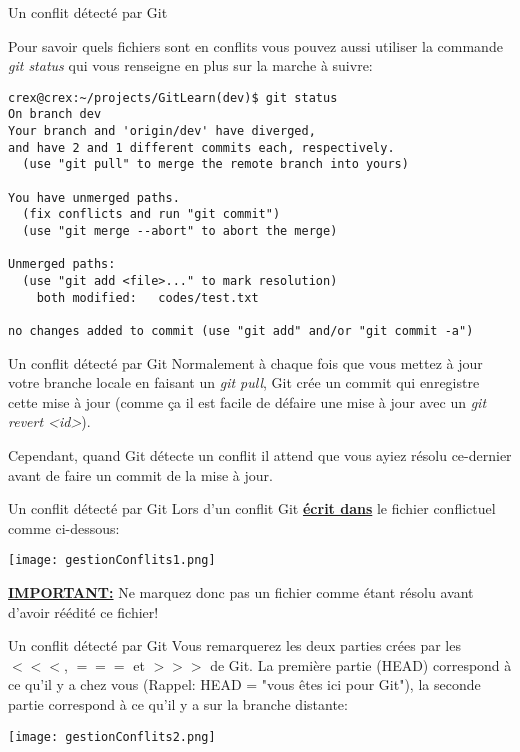 \documentclass{beamer}
\begin{document}
\begin{frame}[fragile]{Un conflit détecté par Git}

Pour savoir quels fichiers sont en conflits vous pouvez aussi utiliser la commande \textit{git status} qui vous renseigne en plus sur la marche à suivre:
\begin{mdframed}[style=Bash]
\begin{lstlisting}[style=Bash, caption=Les fichiers en conflit indiqués par git status]
crex@crex:~/projects/GitLearn(dev)$ git status
On branch dev
Your branch and 'origin/dev' have diverged,
and have 2 and 1 different commits each, respectively.
  (use "git pull" to merge the remote branch into yours)

You have unmerged paths.
  (fix conflicts and run "git commit")
  (use "git merge --abort" to abort the merge)

Unmerged paths:
  (use "git add <file>..." to mark resolution)
	both modified:   codes/test.txt

no changes added to commit (use "git add" and/or "git commit -a")
\end{lstlisting}
\end{mdframed}
\end{frame}

\begin{frame}{Un conflit détecté par Git}
Normalement à chaque fois que vous mettez à jour votre branche locale en faisant un \textit{git pull}, Git crée un commit qui enregistre cette mise à jour (comme ça il est facile de défaire une mise à jour avec un \textit{git revert <id>}).\\
\medskip

Cependant, quand Git détecte un conflit il attend que vous ayiez résolu ce-dernier avant de faire un commit de la mise à jour.
\end{frame}

\begin{frame}[fragile]{Un conflit détecté par Git}
Lors d'un conflit Git \textbf{\underline{écrit dans}} le fichier conflictuel comme ci-dessous:
\smallskip
\begin{center}
	\texttt{[image: gestionConflits1.png]}
\end{center}

\underline{\textbf{IMPORTANT:}} Ne marquez donc pas un fichier comme étant résolu avant d'avoir réédité ce fichier!
\end{frame}

\begin{frame}[fragile]{Un conflit détecté par Git}
Vous remarquerez les deux parties crées par les $<<<$, $===$ et $>>>$ de Git. La première partie (HEAD) correspond à ce qu'il y a chez vous (Rappel: HEAD = "vous êtes ici pour Git"), la seconde partie correspond à ce qu'il y a sur la branche distante:
\smallskip
\begin{center}
	\texttt{[image: gestionConflits2.png]}
\end{center}
\end{frame}
\end{document}
